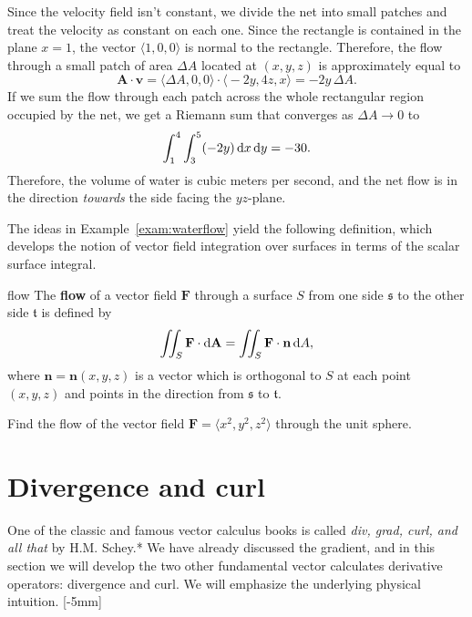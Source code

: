 \documentclass[svgnames]{watsonbook}
\begin{document}
\begin{solution}
  Since the velocity field isn't constant, we divide the net into
  small patches and treat the velocity as constant on each one. Since
  the rectangle is contained in the plane $x=1$, the vector
  $\langle 1, 0, 0 \rangle$ is normal to the rectangle. Therefore, the flow
  through a small patch of area $\Delta A$ located at $(x,y,z)$ is
  approximately equal to
  \[
    \mathbf{A} \cdot \mathbf{v} = \big\langle \Delta A, 0, 0 \big\rangle \cdot
    \big\langle -2y, 4z, x \big\rangle = -2y \, \Delta A. 
  \]
  If we sum the flow through each patch across the whole rectangular
  region occupied by the net, we get a Riemann sum that converges as
  $\Delta A \to 0$ to
  \[
    \int_1^4 \int_3^5 (-2y) \, \mathrm{d} x \, \mathrm{d} y = -30. 
  \]
  Therefore, the volume of water is  cubic meters per second, and the
  net flow is in the direction \textit{towards} the side facing the $yz$-plane. 
\end{solution}

The ideas in Example~\ref{exam:waterflow} yield the following
definition, which develops the notion of vector field integration over
surfaces in terms of the scalar surface
integral. 

\begin{defn}{}{flow}
  The \textbf{flow} of a vector field $\mathbf{F}$ through a surface
  $S$ from one side $\mathfrak{s}$ to the other side $\mathfrak{t}$ is defined by
  \[
    \iint_S \mathbf{F} \cdot \mathrm{d}\mathbf{A} =  \iint_S \mathbf{F} \cdot \mathbf{n}
    \, {\mathrm{d}}A, 
  \]
  where $\mathbf{n}=\mathbf{n}(x,y,z)$ is a vector which is
  orthogonal to $S$ at each point $(x,y,z)$ and points in the
  direction from $\mathfrak{s}$ to $\mathfrak{t}$. 
\end{defn}

\begin{exercise}{}{}
  Find the flow of the vector field $\mathbf{F} = \langle x^2, y^2, z^2 \rangle$
  through the unit sphere. 
\end{exercise}

\section{Divergence and curl} \label{sec:divcurl} 

One of the classic and famous vector calculus books is called \textit{div,
  grad, curl, and all that} by H.M. Schey.* We have already discussed the gradient,
and in this section we will develop the two other fundamental vector
calculates derivative operators: divergence and curl. We will
emphasize the underlying physical intuition. [-5mm]
\end{document}
